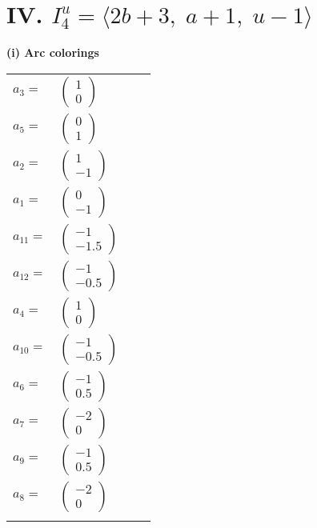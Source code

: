 \documentclass[1p]{elsarticle_modified}
\theoremstyle{definition}
\begin{document}
\centering \section*{IV. $I^u_{4}= \langle 2 b+3,\;a+1,\;u-1 \rangle$}
\flushleft \textbf{(i) Arc colorings}\\
\begin{tabular}{m{7pt} m{180pt} m{7pt} m{180pt} }
\flushright $a_{3}=$&$\begin{pmatrix}1\\0\end{pmatrix}$ \\
\flushright $a_{5}=$&$\begin{pmatrix}0\\1\end{pmatrix}$ \\
\flushright $a_{2}=$&$\begin{pmatrix}1\\-1\end{pmatrix}$ \\
\flushright $a_{1}=$&$\begin{pmatrix}0\\-1\end{pmatrix}$ \\
\flushright $a_{11}=$&$\begin{pmatrix}-1\\-1.5\end{pmatrix}$ \\
\flushright $a_{12}=$&$\begin{pmatrix}-1\\-0.5\end{pmatrix}$ \\
\flushright $a_{4}=$&$\begin{pmatrix}1\\0\end{pmatrix}$ \\
\flushright $a_{10}=$&$\begin{pmatrix}-1\\-0.5\end{pmatrix}$ \\
\flushright $a_{6}=$&$\begin{pmatrix}-1\\0.5\end{pmatrix}$ \\
\flushright $a_{7}=$&$\begin{pmatrix}-2\\0\end{pmatrix}$ \\
\flushright $a_{9}=$&$\begin{pmatrix}-1\\0.5\end{pmatrix}$ \\
\flushright $a_{8}=$&$\begin{pmatrix}-2\\0\end{pmatrix}$\\&\end{tabular}
\end{document}
